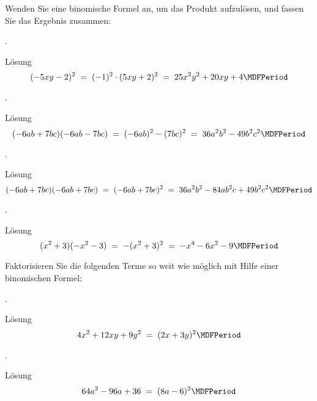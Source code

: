 \begin{MExercises}
\begin{MExercise}
Wenden Sie eine binomische Formel an, um das Produkt aufzulösen, und fassen Sie das Ergebnis zusammen:
\begin{MExerciseItems}
\item{. \begin{MHint}{Lösung}$$(-5x y-2)^2 \;=\; (-1)^2\cdot(5x y+2)^2 \;=\; 25x^2y^2+20x y+4 \MDFPeriod $$\end{MHint}}
\item{. \begin{MHint}{Lösung}$$ (-6a b+7b c)(-6a b-7b c) \;=\; (-6a b)^2-(7b c)^2 \;=\; 36a^2b^2-49b^2c^2 \MDFPeriod $$\end{MHint}}
\item{. \begin{MHint}{Lösung}$$ (-6a b+7b c)(-6a b+7b c) \;=\; (-6a b +7b c)^2 \;=\; 36a^2b^2-84a b^2c+49b^2c^2 \MDFPeriod $$\end{MHint}} 
\item{. \begin{MHint}{Lösung}$$ (x^2+3)(-x^2-3)\;=\; -(x^2+3)^2\;=\; -x^4-6x^2-9 \MDFPeriod $$\end{MHint}}
\end{MExerciseItems}
\end{MExercise}
\begin{MExercise}
Faktorisieren Sie die folgenden Terme so weit wie möglich mit Hilfe einer binomischen Formel:
\begin{MExerciseItems}
\item{. \begin{MHint}{Lösung}$$4x^2+12x y+9y^2 \;=\; (2x+3y)^2   \MDFPeriod $$\end{MHint}}
\item{. \begin{MHint}{Lösung}$$64a^2-96a+36\;=\;(8a-6)^2   \MDFPeriod $$\end{MHint}}

\end{MExerciseItems}
\end{MExercise}
\end{MExercises}
